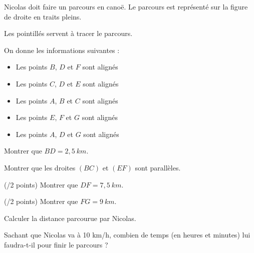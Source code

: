 \begin{minipage}[t]{0.45\textwidth}
    Nicolas doit faire un parcours en canoë. Le parcours est représenté sur la figure de droite en traits pleins.
    
    Les pointillés servent à tracer le parcours.

    On donne les informations suivantes :
    \begin{itemize}
        \item Les points $B$, $D$ et $F$ sont alignés
        \item Les points $C$, $D$ et $E$ sont alignés
        \item Les points $A$, $B$ et $C$ sont alignés
        \item Les points $E$, $F$ et $G$ sont alignés
        \item Les points $A$, $D$ et $G$ sont alignés
    \end{itemize}
    \vspace{1em}

    \cnt Montrer que $BD=2,5~km$.

    \cnt Montrer que les droites $(BC)$ et $(EF)$ sont parallèles.

    \cnt (/2 points) Montrer que $DF=7,5~km$.

    \cnt (/2 points) Montrer que $FG=9~km$.

    \cnt Calculer la distance parcourue par Nicolas.

    \cnt Sachant que Nicolas va à 10 km/h, combien de temps (en heures et minutes) lui faudra-t-il pour finir le parcours ? 
\end{minipage}
\hfill
